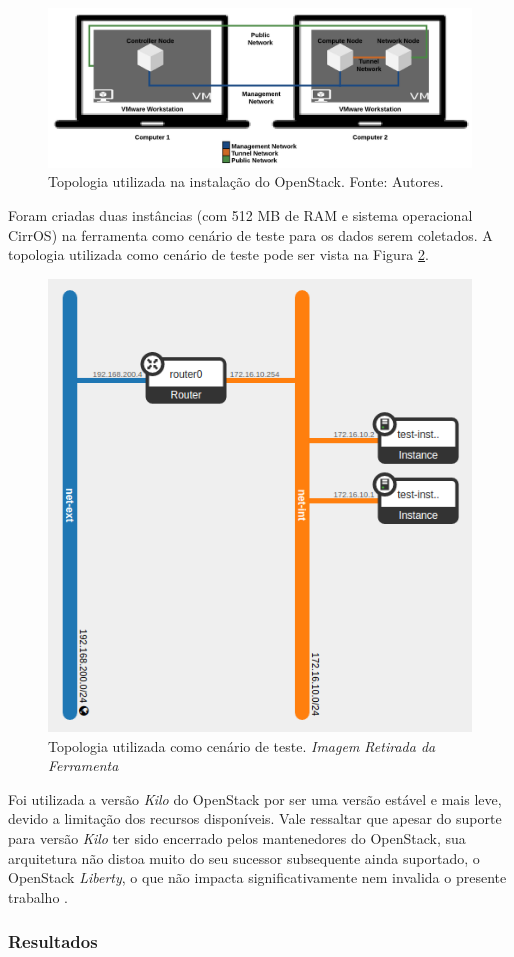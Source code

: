 \documentclass[conference]{IEEEtran}
\begin{document}
	\begin{figure}[ht]
	\centering
	\includegraphics[width=.5\textwidth]{figuras/topologia.png}
	\caption{Topologia utilizada na instalação do OpenStack. Fonte: Autores.}
	\label{fig:topologia}
	\end{figure}
	
	Foram criadas duas instâncias (com 512 MB de RAM e sistema operacional CirrOS) na ferramenta como cenário de teste
	para os dados serem coletados.
	A topologia utilizada como cenário de teste pode ser vista na Figura \ref{fig:instancias}.
    
	 
	\begin{figure}[ht]
	\centering
	\includegraphics[width=.4\textwidth]{figuras/topologia_teste.png}
	\caption{Topologia utilizada como cenário de teste. {\tiny \textit{Imagem Retirada da Ferramenta}}}
	\label{fig:instancias}
	\end{figure}
	
	Foi utilizada a versão \textit{Kilo} \cite{openstack_kilo} do OpenStack por ser uma versão estável e mais leve, devido a
	limitação dos recursos disponíveis.
	Vale ressaltar que apesar do suporte para versão \textit{Kilo} ter sido encerrado pelos mantenedores do OpenStack,
	sua arquitetura não distoa muito do seu sucessor subsequente ainda suportado, o OpenStack \textit{Liberty}, o que
	não impacta significativamente nem invalida o presente trabalho \cite{openstack_liberty}.

		    
    \subsubsection{Resultados} \label{resultados_levantamento}
  
\end{document}
